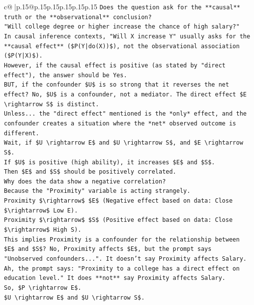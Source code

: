 \documentclass{article}
\begin{document}
{\begin{supertabular}{c@{$\;$}|p{.15\linewidth}@{}p{.15\linewidth}p{.15\linewidth}p{.15\linewidth}p{.15\linewidth}p{.15\linewidth}}
{{{\texttt{Does the question ask for the **causal** truth or the **observational** conclusion?} \\
\texttt{"Will college degree or higher increase the chance of high salary?"} \\
\texttt{In causal inference contexts, "Will X increase Y" usually asks for the **causal effect** (\$P(Y|do(X))\$), not the observational association (\$P(Y|X)\$).} \\
\texttt{However, if the causal effect is positive (as stated by "direct effect"), the answer should be Yes.} \\
\texttt{BUT, if the confounder \$U\$ is so strong that it reverses the net effect? No, \$U\$ is a confounder, not a mediator. The direct effect \$E \textbackslash{}rightarrow S\$ is distinct.} \\
\texttt{Unless... the "direct effect" mentioned is the *only* effect, and the confounder creates a situation where the *net* observed outcome is different.} \\
\texttt{Wait, if \$U \textbackslash{}rightarrow E\$ and \$U \textbackslash{}rightarrow S\$, and \$E \textbackslash{}rightarrow S\$.} \\
\texttt{If \$U\$ is positive (high ability), it increases \$E\$ and \$S\$.} \\
\texttt{Then \$E\$ and \$S\$ should be positively correlated.} \\
\texttt{Why does the data show a negative correlation?} \\
\texttt{Because the "Proximity" variable is acting strangely.} \\
\texttt{Proximity \$\textbackslash{}rightarrow\$ \$E\$ (Negative effect based on data: Close \$\textbackslash{}rightarrow\$ Low E).} \\
\texttt{Proximity \$\textbackslash{}rightarrow\$ \$S\$ (Positive effect based on data: Close \$\textbackslash{}rightarrow\$ High S).} \\
\texttt{This implies Proximity is a confounder for the relationship between \$E\$ and \$S\$? No, Proximity affects \$E\$, but the prompt says "Unobserved confounders...". It doesn't say Proximity affects Salary.} \\
\texttt{Ah, the prompt says: "Proximity to a college has a direct effect on education level." It does **not** say Proximity affects Salary.} \\
\texttt{So, \$P \textbackslash{}rightarrow E\$.} \\
\texttt{\$U \textbackslash{}rightarrow E\$ and \$U \textbackslash{}rightarrow S\$.} \\
}}}
\end{supertabular}}
\end{document}
